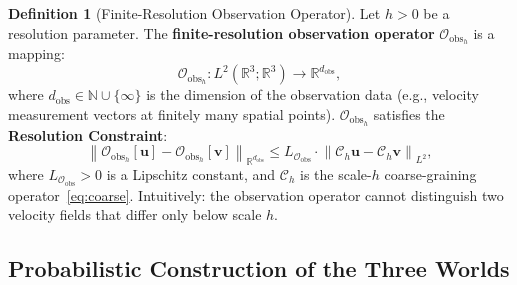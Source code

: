 \documentclass[11pt,a4paper]{article}
\theoremstyle{definition}
\newtheorem{definition}[theorem]{Definition}
\theoremstyle{remark}
\newcommand{\R}{\mathbb{R}}
\newcommand{\N}{\mathbb{N}}
\newcommand{\norm}[1]{\left\lVert#1\right\rVert}
\newcommand{\Obs}{\mathcal{O}_{\text{obs}}}
\begin{document}
\begin{definition}[Finite-Resolution Observation Operator]
\label{def:obs}
Let $h > 0$ be a resolution parameter. The \textbf{finite-resolution observation operator} $\Obs_h$ is a mapping:
\begin{equation}
  \Obs_h: L^2(\R^3; \R^3) \to \R^{d_{\text{obs}}},
\end{equation}
where $d_{\text{obs}} \in \N \cup \{\infty\}$ is the dimension of the observation data (e.g., velocity measurement vectors at finitely many spatial points). $\Obs_h$ satisfies the \textbf{Resolution Constraint}:
\begin{equation}\label{eq:obs_condition}
  \norm{\Obs_h[\bm{u}] - \Obs_h[\bm{v}]}_{\R^{d_{\text{obs}}}}
  \leq L_{\Obs} \cdot \norm{\mathcal{C}_h \bm{u} - \mathcal{C}_h \bm{v}}_{L^2},
\end{equation}
where $L_{\Obs} > 0$ is a Lipschitz constant, and $\mathcal{C}_h$ is the scale-$h$ coarse-graining operator~\eqref{eq:coarse}. Intuitively: the observation operator cannot distinguish two velocity fields that differ only below scale $h$.
\end{definition}

\subsection{Probabilistic Construction of the Three Worlds}
\end{document}
